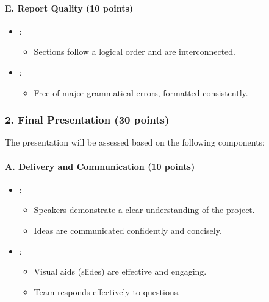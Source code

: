 \documentclass[letterpaper,10pt,english]{jupyterBook}
\begin{document}
\paragraph{E. Report Quality (10 points)}
\label{\detokenize{ProjectInstructions:e-report-quality-10-points}}\begin{itemize}
\item {} 
\sphinxAtStartPar
{}:
\begin{itemize}
\item {} 
\sphinxAtStartPar
Sections follow a logical order and are interconnected.

\end{itemize}

\item {} 
\sphinxAtStartPar
{}:
\begin{itemize}
\item {} 
\sphinxAtStartPar
Free of major grammatical errors, formatted consistently.

\end{itemize}

\end{itemize}


\subsubsection{2. Final Presentation (30 points)}
\label{\detokenize{ProjectInstructions:id10}}
\sphinxAtStartPar
The presentation will be assessed based on the following components:


\paragraph{A. Delivery and Communication (10 points)}
\label{\detokenize{ProjectInstructions:id11}}\begin{itemize}
\item {} 
\sphinxAtStartPar
{}:
\begin{itemize}
\item {} 
\sphinxAtStartPar
Speakers demonstrate a clear understanding of the project.

\item {} 
\sphinxAtStartPar
Ideas are communicated confidently and concisely.

\end{itemize}

\item {} 
\sphinxAtStartPar
{}:
\begin{itemize}
\item {} 
\sphinxAtStartPar
Visual aids (slides) are effective and engaging.

\item {} 
\sphinxAtStartPar
Team responds effectively to questions.

\end{itemize}

\end{itemize}
\end{document}
